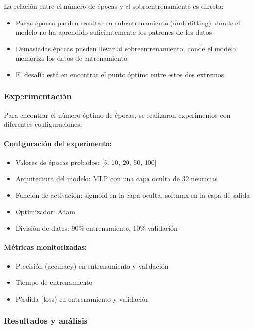 \documentclass[11pt,a4paper]{article}
\begin{document}
La relación entre el número de épocas y el sobreentrenamiento es directa:
\begin{itemize}
	\item Pocas épocas pueden resultar en subentrenamiento (underfitting), donde el modelo no ha aprendido suficientemente los patrones de los datos
	\item Demasiadas épocas pueden llevar al sobreentrenamiento, donde el modelo memoriza los datos de entrenamiento
	\item El desafío está en encontrar el punto óptimo entre estos dos extremos
\end{itemize}

\subsubsection{Experimentación}
Para encontrar el número óptimo de épocas, se realizaron experimentos con diferentes configuraciones:

\paragraph{Configuración del experimento:}
\begin{itemize}
	\item Valores de épocas probados: [5, 10, 20, 50, 100]
	\item Arquitectura del modelo: MLP con una capa oculta de 32 neuronas
	\item Función de activación: sigmoid en la capa oculta, softmax en la capa de salida
	\item Optimizador: Adam
	\item División de datos: 90\% entrenamiento, 10\% validación
\end{itemize}

\paragraph{Métricas monitorizadas:}
\begin{itemize}
	\item Precisión (accuracy) en entrenamiento y validación
	\item Tiempo de entrenamiento
	\item Pérdida (loss) en entrenamiento y validación
\end{itemize}

\subsubsection{Resultados y análisis}
\end{document}
